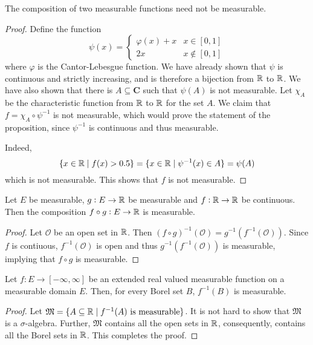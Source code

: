 \begin{proposition}
    The composition of two measurable functions need not be measurable.
\end{proposition}
\begin{proof}
    Define the function 
    \begin{equation*}
        \psi(x) = 
        \begin{cases}
            \varphi(x) + x & x\in [0,1]\\
            2x & x\notin[0,1]
        \end{cases}
    \end{equation*}
    where $\varphi$ is the Cantor-Lebesgue function. We have already shown that $\psi$ is continuous and strictly increasing, and is therefore a bijection from $\mathbb{R}$ to $\mathbb{R}$. We have also shown that there is $A\subseteq\mathbf C$ such that $\psi(A)$ is not measurable. Let $\chi_A$ be the characteristic function from $\mathbb{R}$ to $\mathbb{R}$ for the set $A$. We claim that $f = \chi_A\circ\psi^{-1}$ is not measurable, which would prove the statement of the proposition, since $\psi^{-1}$ is continuous and thus measurable.

    Indeed, 
    \begin{equation*}
        \{x\in\mathbb{R}\mid f(x) > 0.5\} = \{x\in\mathbb{R}\mid\psi^{-1}(x)\in A\} = \psi(A)
    \end{equation*}
    which is not measurable. This shows that $f$ is not measurable.
\end{proof}

\begin{proposition}
    Let $E$ be measurable, $g: E\to\mathbb{R}$ be measurable and $f:\mathbb{R}\to\mathbb{R}$ be continuous. Then the composition $f\circ g: E\to\mathbb{R}$ is measurable.
\end{proposition}
\begin{proof}
    Let $\mathcal O$ be an open set in $\mathbb{R}$. Then $(f\circ g)^{-1}(\mathcal O) = g^{-1}(f^{-1}(\mathcal O))$. Since $f$ is contiuous, $f^{-1}(\mathcal O)$ is open and thus $g^{-1}(f^{-1}(\mathcal O))$ is measurable, implying that $f\circ g$ is measurable.
\end{proof}

\begin{proposition}
    Let $f: E\to[-\infty,\infty]$ be an extended real valued measurable function on a measurable domain $E$. Then, for every Borel set $B$, $f^{-1}(B)$ is measurable.
\end{proposition}
\begin{proof}
    Let $\mathfrak M = \{A\subseteq\mathbb{R}\mid f^{-1}(A)\text{ is measurable}\}$. It is not hard to show that $\mathfrak M$ is a $\sigma$-algebra. Further, $\mathfrak M$ contains all the open sets in $\mathbb{R}$, consequently, contains all the Borel sets in $\mathbb{R}$. This completes the proof.
\end{proof}

